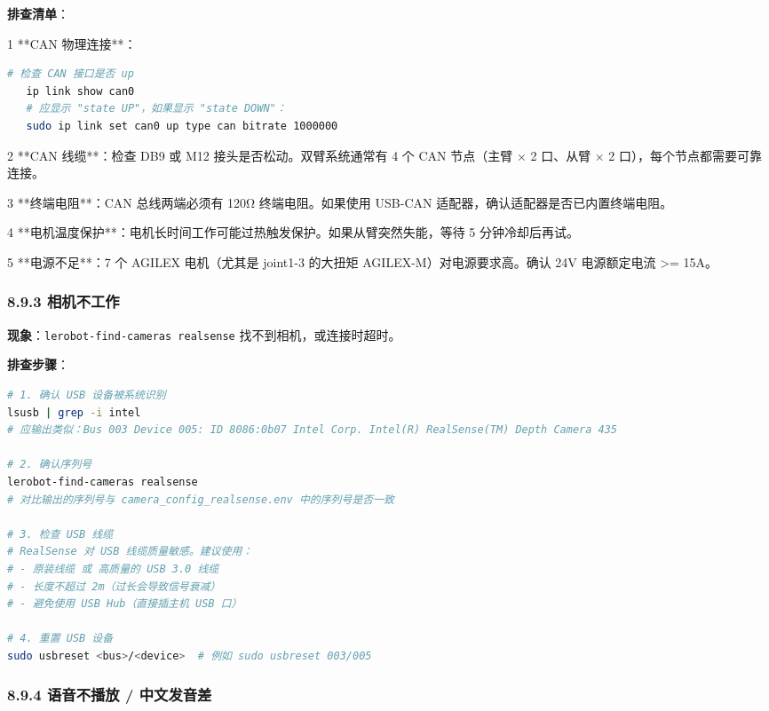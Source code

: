 \documentclass[UTF8,a4paper,11pt]{ctexart}
\begin{document}
{\textbf{排查清单}：

\item[1] **CAN 物理连接**：
\begin{lstlisting}[language=bash]
   # 检查 CAN 接口是否 up
   ip link show can0
   # 应显示 "state UP"，如果显示 "state DOWN"：
   sudo ip link set can0 up type can bitrate 1000000
\end{lstlisting}

\item[2] **CAN 线缆**：检查 DB9 或 M12 接头是否松动。双臂系统通常有 4 个 CAN 节点（主臂 × 2 口、从臂 × 2 口），每个节点都需要可靠连接。

\item[3] **终端电阻**：CAN 总线两端必须有 120Ω 终端电阻。如果使用 USB-CAN 适配器，确认适配器是否已内置终端电阻。

\item[4] **电机温度保护**：电机长时间工作可能过热触发保护。如果从臂突然失能，等待 5 分钟冷却后再试。

\item[5] **电源不足**：7 个 AGILEX 电机（尤其是 joint1-3 的大扭矩 AGILEX-M）对电源要求高。确认 24V 电源额定电流 >= 15A。

\subsubsection{8.9.3 相机不工作}

\textbf{现象}：\texttt{lerobot-find-cameras realsense} 找不到相机，或连接时超时。

\textbf{排查步骤}：

\begin{lstlisting}[language=bash]
# 1. 确认 USB 设备被系统识别
lsusb | grep -i intel
# 应输出类似：Bus 003 Device 005: ID 8086:0b07 Intel Corp. Intel(R) RealSense(TM) Depth Camera 435

# 2. 确认序列号
lerobot-find-cameras realsense
# 对比输出的序列号与 camera_config_realsense.env 中的序列号是否一致

# 3. 检查 USB 线缆
# RealSense 对 USB 线缆质量敏感。建议使用：
# - 原装线缆 或 高质量的 USB 3.0 线缆
# - 长度不超过 2m（过长会导致信号衰减）
# - 避免使用 USB Hub（直接插主机 USB 口）

# 4. 重置 USB 设备
sudo usbreset <bus>/<device>  # 例如 sudo usbreset 003/005
\end{lstlisting}

\subsubsection{8.9.4 语音不播放 / 中文发音差}

}
\end{document}
